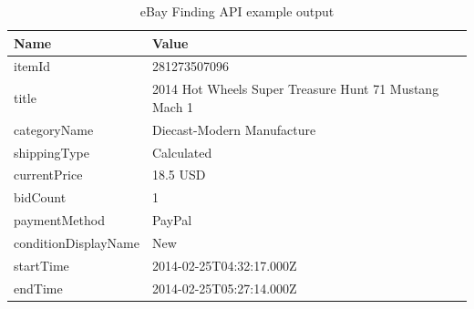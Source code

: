 \begin{table}[h!]
	\begin{center}
	\begin{tabular}{| p{6.5cm} | p{6.5cm} |}
		\hline
		\textbf{Name} & \textbf{Value} \\
		\hline
		itemId & 281273507096 \\
		\hline
		title & 2014 Hot Wheels Super Treasure Hunt 71 Mustang Mach 1 \\
		\hline
		categoryName & Diecast-Modern Manufacture \\
		\hline
		shippingType & Calculated \\
		\hline
		currentPrice & 18.5 USD \\
		\hline
		bidCount & 1 \\
		\hline
		paymentMethod & PayPal \\
		\hline
		conditionDisplayName & New \\
		\hline
		startTime & 2014-02-25T04:32:17.000Z \\
		\hline
		endTime & 2014-02-25T05:27:14.000Z \\
		\hline
	\end{tabular}
	\end{center}
	\caption{eBay Finding API example output}
\end{table}
